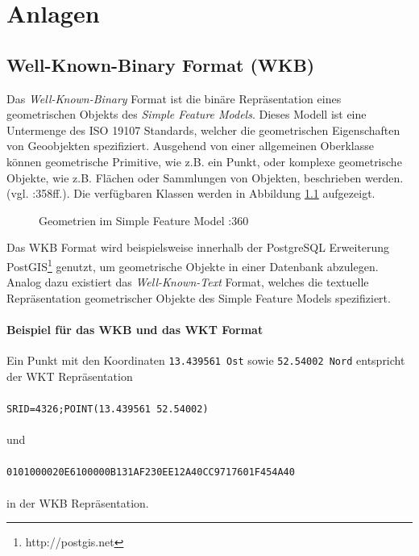 \appendix
\chapter{Anlagen}
\section{Well-Known-Binary Format (WKB)}
\label{sec:appendix:wkb}
Das \textit{Well-Known-Binary} Format ist die binäre Repräsentation eines geometrischen Objekts des \textit{Simple Feature Models}.
Dieses Modell ist eine Untermenge des ISO 19107 Standards, welcher die geometrischen Eigenschaften von Geoobjekten spezifiziert. Ausgehend von einer allgemeinen Oberklasse können geometrische Primitive, wie z.B. ein Punkt, oder komplexe geometrische Objekte, wie z.B. Flächen oder Sammlungen von Objekten, beschrieben werden. (vgl. \cite{Bill2010}:358ff.). Die verfügbaren Klassen werden in Abbildung \ref{fig:bill_sfm} aufgezeigt.
\begin{figure}[!htb]
  \centering
   \caption{Geometrien im Simple Feature Model \protect\cite{Bill2010}:360}
   \label{fig:bill_sfm}
\end{figure}

Das WKB Format wird beispielsweise innerhalb der PostgreSQL Erweiterung PostGIS\footnote{http://postgis.net} genutzt, um geometrische Objekte in einer Datenbank abzulegen.
Analog dazu existiert das \textit{Well-Known-Text} Format, welches die textuelle Repräsentation geometrischer Objekte des Simple Feature Models spezifiziert.

\subsubsection{Beispiel für das WKB und das WKT Format}
Ein Punkt mit den Koordinaten \texttt{13.439561 Ost} sowie \texttt{52.54002 Nord} entspricht der WKT Repräsentation\\\\
\texttt{SRID=4326;POINT(13.439561 52.54002)}\\\\
und\\\\
\texttt{0101000020E6100000B131AF230EE12A40CC9717601F454A40}\\\\
in der WKB Repräsentation.

